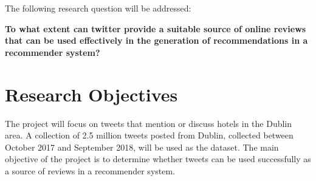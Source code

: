 The following research question will be addressed:
\begin{center}
\textbf{To what extent can twitter provide a suitable source of online reviews that can be used effectively in the generation of recommendations in a recommender system?}
\end{center}

\section{Research Objectives}
The project will focus on tweets that mention or discuss hotels in the Dublin area. A collection of 2.5 million tweets posted from Dublin, collected between October 2017 and September 2018, will be used as the dataset. The main objective of the project is to determine whether tweets can be used successfully as a source of reviews in a recommender system.

